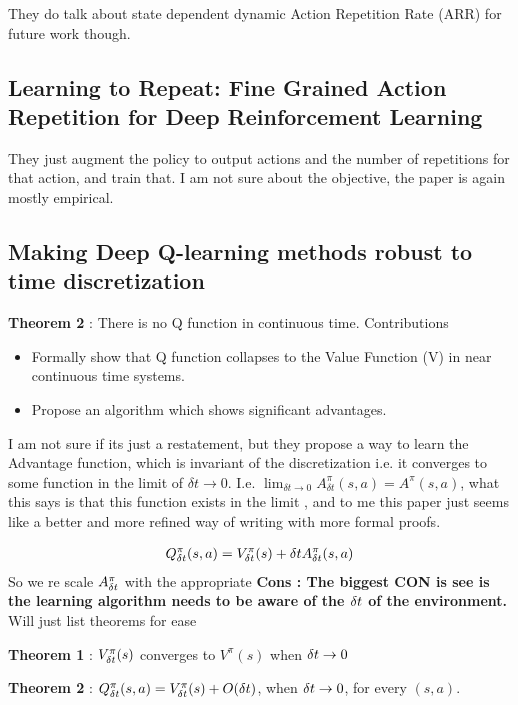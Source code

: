 \documentclass[11pt]{article}
\begin{document}
They do talk about state dependent dynamic Action Repetition Rate (ARR) for future work though. 


\subsection{Learning to Repeat: Fine Grained Action Repetition for Deep Reinforcement Learning} \cite{sharma2020learning}
They just augment the policy to output actions and the number of repetitions for that action, and train that. I am not sure about the objective, the paper is again mostly empirical. 

\subsection{Making Deep Q-learning methods robust to time discretization} \cite{tallec2019making}

\textbf{Theorem 2 }: There is no Q function in continuous time. 
Contributions
\begin{itemize}
    \item Formally show that Q function collapses to the  Value Function (V) in near continuous time systems. 
    \item Propose an algorithm which shows significant advantages. 
\end{itemize}
I am not sure if its just a restatement, but they propose a way to learn the Advantage function, which is invariant of the discretization i.e. it converges to some function in the limit of $\delta t \rightarrow 0$. I.e. $\lim_{ \delta t \rightarrow 0 }A^\pi_{\delta t} (s, a) = A^\pi(s,a) $, what this says is that this function exists in the limit , and to me this paper just seems like a better and more refined way of writing \cite{baird1994reinforcement} with more formal proofs. 

\begin{align*}
    Q^{\pi}_{{\delta t}} (s,a) = V^\pi_{\delta t} (s) + {\delta t} A^\pi_{\delta t} (s,a)
    \end{align*}
So we re scale $A^\pi_{\delta t}$ with the appropriate
\textbf{Cons : The biggest CON is see is the learning algorithm needs to be aware of the ${\delta t}$ of the environment. }
Will just list theorems for ease


\textbf{Theorem 1} : $V^\pi_{\delta t}(s) $ converges to $V^\pi(s) $ when ${\delta t} \rightarrow 0$

\textbf{Theorem 2} : $Q^\pi_{\delta t}(s,a) = V^\pi_{\delta t} (s) + O({\delta t})$, when ${\delta t} \rightarrow 0$, for every $(s,a)$.
\end{document}
